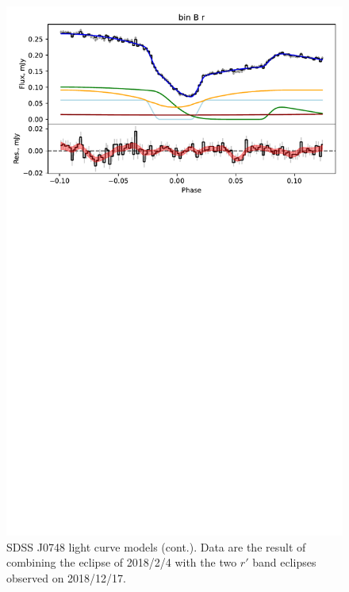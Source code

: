 \begin{figure}
    \centering
    \includegraphics[width=\textwidth, trim={0cm 17cm 0cm 0cm}, clip]{figures/results/SDSS0748/SDSS0748_3.pdf}
    \caption{SDSS J0748 light curve models (cont.). Data are the result of combining the eclipse of 2018/2/4 with the two $r'$ band eclipses observed on 2018/12/17.}
    \label{fig:SDSS J0748 all light curves cont 2}
\end{figure}

